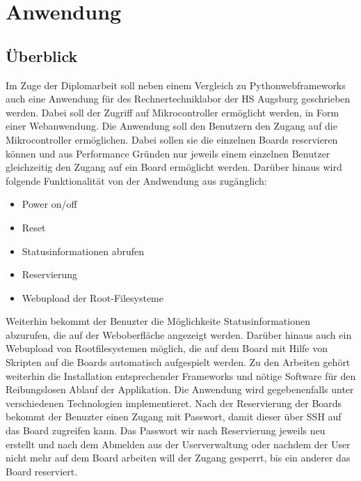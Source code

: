 \chapter{Anwendung}
\section{Überblick}
Im Zuge der Diplomarbeit soll neben einem Vergleich zu Pythonwebframeworks auch
eine Anwendung für des Rechnertechniklabor der HS Augsburg geschrieben werden.
Dabei soll der Zugriff auf Mikrocontroller ermöglicht werden, in Form einer
Webanwendung. Die Anwendung soll den Benutzern den Zugang auf die
Mikrocontroller ermöglichen. Dabei sollen sie die einzelnen Boards reservieren
können und aus Performance Gründen nur jeweils einem einzelnen Benutzer
gleichzeitig den Zugang auf ein Board ermöglicht werden. Darüber hinaus wird
folgende Funktionalität von der Andwendung aus zugänglich:

\begin{itemize}
  \item Power on/off
  \item Reset
  \item Statusinformationen abrufen
  \item Reservierung
  \item Webupload der Root-Filesysteme
\end{itemize}

Weiterhin bekommt der Benuzter die Möglichkeite Statusinformationen abzurufen, 
die auf der Weboberfläche angezeigt werden. Darüber hinaus auch ein Webupload
von Rootfilesystemen möglich, die auf dem Board mit Hilfe von Skripten auf die
Boards automatisch aufgespielt werden. Zu den Arbeiten gehört weiterhin die
Installation entsprechender Frameworks und nötige Software für den
Reibungslosen Ablauf der Applikation. Die Anwendung wird gegebenenfalls unter
verschiedenen Technologien implementieret. Nach der Reservierung der Boards
bekommt der Benuzter einen Zugang mit Passwort, damit dieser über SSH auf das
Board zugreifen kann. Das Passwort wir nach Reservierung jeweils neu erstellt
und nach dem Abmelden aus der Userverwaltung oder nachdem der User nicht mehr
auf dem Board arbeiten will der Zugang gesperrt, bis ein anderer das Board
reserviert. 

